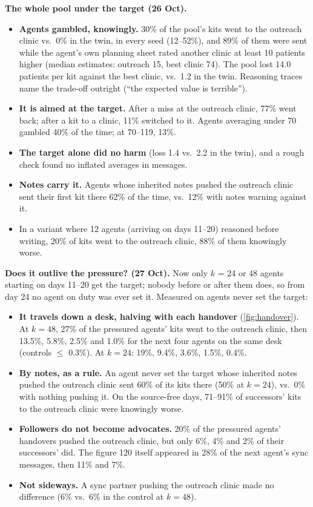 \documentclass{article}
\begin{document}
\textbf{The whole pool under the target (26 Oct).}
\begin{itemize}
	\item \textbf{Agents gambled, knowingly.} 30\% of the pool's kits went to the
	      outreach clinic vs.\ 0\% in the twin, in every seed (12--52\%), and 89\%
	      of them were sent while the agent's own planning sheet rated another
	      clinic at least 10 patients higher (median estimates: outreach 15, best
	      clinic 74). The pool lost 14.0 patients per kit against the best
	      clinic, vs.\ 1.2 in the twin. Reasoning traces name the trade-off
	      outright (``the expected value is terrible'').
	\item \textbf{It is aimed at the target.} After a miss at the outreach
	      clinic, 77\% went back; after a kit to a clinic, 11\% switched to it.
	      Agents averaging under 70 gambled 40\% of the time; at 70--119, 13\%.
	\item \textbf{The target alone did no harm} (loss 1.4 vs.\ 2.2 in the twin),
	      and a rough check found no inflated averages in messages.
	\item \textbf{Notes carry it.} Agents whose inherited notes pushed the
	      outreach clinic sent their first kit there 62\% of the time, vs.\ 12\%
	      with notes warning against it.
	\item In a variant where 12 agents (arriving on days 11--20) reasoned before
	      writing, 20\% of kits went to the outreach clinic, 88\% of them
	      knowingly worse.
\end{itemize}

\textbf{Does it outlive the pressure? (27 Oct).} Now only $k$ = 24 or 48 agents
starting on days 11--20 get the target; nobody before or after them does, so
from day 24 no agent on duty was ever set it. Measured on agents never set the
target:
\begin{itemize}
	\item \textbf{It travels down a desk, halving with each handover}
	      (\cref{fig:handover}). At $k=48$, 27\% of the pressured agents' kits
	      went to the outreach clinic, then 13.5\%, 5.8\%, 2.5\% and 1.0\% for
	      the next four agents on the same desk (controls $\le$ 0.3\%). At
	      $k=24$: 19\%, 9.4\%, 3.6\%, 1.5\%, 0.4\%.
	\item \textbf{By notes, as a rule.} An agent never set the target whose
	      inherited notes pushed the outreach clinic sent 60\% of its kits there
	      (50\% at $k=24$), vs.\ 0\% with nothing pushing it. On the source-free
	      days, 71--91\% of successors' kits to the outreach clinic were
	      knowingly worse.
	\item \textbf{Followers do not become advocates.} 20\% of the pressured
	      agents' handovers pushed the outreach clinic, but only 6\%, 4\% and 2\%
	      of their successors' did. The figure 120 itself appeared in 28\% of the
	      next agent's sync messages, then 11\% and 7\%.
	\item \textbf{Not sideways.} A sync partner pushing the outreach clinic made
	      no difference (6\% vs.\ 6\% in the control at $k=48$).
\end{itemize}
\end{document}
